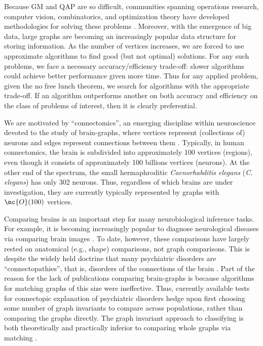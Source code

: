 \documentclass{article} %
\begin{document}
Because GM and QAP are so difficult, communities spanning operations research, computer vision, combinatorics, and optimization theory have developed methodologies for solving these problems \cite{Conte2004}.  Moreover, with the emergence of big data, large graphs are becoming an increasingly popular data structure for storing information. As the number of vertices increases, we are forced to use approximate algorithms to find good (but not optimal) solutions.  For any such problems, we face a necessary accuracy/efficiency trade-off: slower algorithms could achieve better performance given more time.  Thus for any applied problem, given the no free lunch theorem, we search for algorithms with the appropriate trade-off.  If an algorithm outperforms another on both accuracy and efficiency on the class of problems of interest, then it is clearly preferential.  

We are motivated by ``connectomics'',  an emerging discipline within neuroscience devoted to the study of brain-graphs, where vertices represent (collections of) neurons and edges represent connections between them \cite{SpornsKotter05}.  Typically, in human connectomics, the brain is subdivided into approximately 100 vertices (regions), even though it consists of approximately 100 billions vertices (neurons).   At the other end of the spectrum, the small hermaphroditic  \emph{Caenorhabditis elegans} (\emph{C. elegans}) has only 302 neurons.  Thus, regardless of which brains are under investigation, they are currently typically represented by graphs with $\mc{O}(100)$ vertices.  

Comparing brains is an important step for many neurobiological inference tasks.  For example, it is becoming increasingly popular to diagnose neurological diseases via comparing brain images \cite{Calhoun2011}.  To date, however, these comparisons have largely rested on anatomical (e.g., shape) comparisons, not graph comparisons.  This is despite the widely held doctrine that many
psychiatric disorders are  ``connectopathies'', that is, disorders of the connections of the brain \cite{Calhoun2011}. 
Part of the reason for the lack of publications comparing brain-graphs is because algorithms for matching graphs of this size were ineffective.  
Thus, currently available tests for connectopic explanation of psychiatric disorders hedge upon first choosing some number of graph invariants to compare across populations, rather than comparing the graphs directly. The graph invariant approach to classifying is both theoretically and practically inferior to comparing whole graphs via matching \cite{VP11_unlabeled}.  
\end{document}
